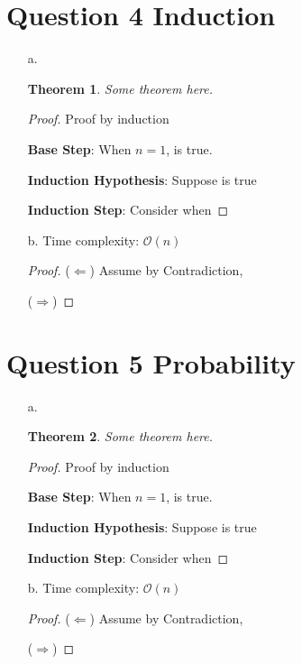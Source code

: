 \documentclass[11pt,fleqn]{article}
\newcommand{\bigO}{\ensuremath{\mathcal{O}}}
\newcommand{\Base}{\textbf{Base Step}: }
\newcommand{\IH}{\textbf{Induction Hypothesis}: }
\newcommand{\IS}{\textbf{Induction Step}: }
\newtheorem*{theorem}{Theorem}
\theoremstyle{definition}
\theoremstyle{remark}
\begin{document}
\newpage
\clearpage

\section{Question 4 Induction}
\begin{enumerate}
    \item[a.]
    \begin{theorem}
        Some theorem here.
    \end{theorem}
    \begin{proof} Proof by induction
    
    \Base {When $n=1$, is true.}
    
    \IH {Suppose is true}
    
    \IS Consider when 
    \end{proof}
    
    \item[b.]
    Time complexity: $\bigO (n)$
    \begin{proof}
    ($\Leftarrow$) Assume by Contradiction,
    
    ($\Rightarrow$)
    \end{proof}
    
\end{enumerate}
\newpage
\clearpage

\section{Question 5 Probability}
\begin{enumerate}
    \item[a.]
    \begin{theorem}
        Some theorem here.
    \end{theorem}
    \begin{proof} Proof by induction
    
    \Base {When $n=1$, is true.}
    
    \IH {Suppose is true}
    
    \IS Consider when 
    \end{proof}
    
    \item[b.]
    Time complexity: $\bigO (n)$
    \begin{proof}
    ($\Leftarrow$) Assume by Contradiction,
    
    ($\Rightarrow$)
    \end{proof}
    
\end{enumerate}
\newpage
\clearpage
\end{document}
